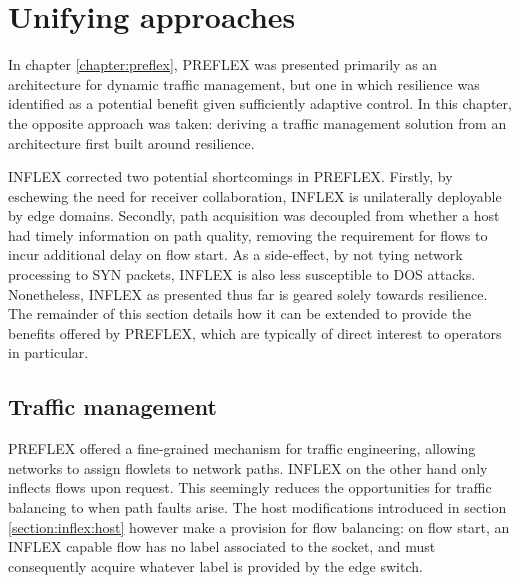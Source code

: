 \section{Unifying approaches}
\label{section:inflex:discussion}

In chapter \ref{chapter:preflex}, \ac{PREFLEX} was presented primarily as an architecture for dynamic traffic management, but one in which resilience was identified as a potential benefit given sufficiently adaptive control.
In this chapter, the opposite approach was taken: deriving a traffic management solution from an architecture first built around resilience.

INFLEX corrected two potential shortcomings in PREFLEX.
Firstly, by eschewing the need for receiver collaboration, INFLEX is unilaterally deployable by edge domains.
Secondly, path acquisition was decoupled from whether a host had timely information on path quality, removing the requirement for flows to incur additional delay on flow start.
As a side-effect, by not tying network processing to SYN packets, INFLEX is also less susceptible to \ac{DOS} attacks.
Nonetheless, INFLEX as presented thus far is geared solely towards resilience.
The remainder of this section details how it can be extended to provide the benefits offered by \ac{PREFLEX}, which are typically of direct interest to operators in particular.

\subsection{Traffic management}

\ac{PREFLEX} offered a fine-grained mechanism for traffic engineering, allowing networks to assign flowlets to network paths.
INFLEX on the other hand only inflects flows upon request. 
This seemingly reduces the opportunities for traffic balancing to when path faults arise.
The host modifications introduced in section \ref{section:inflex:host} however make a provision for flow balancing: on flow start, an INFLEX capable flow has no label associated to the socket, and must consequently acquire whatever label is provided by the edge switch.


